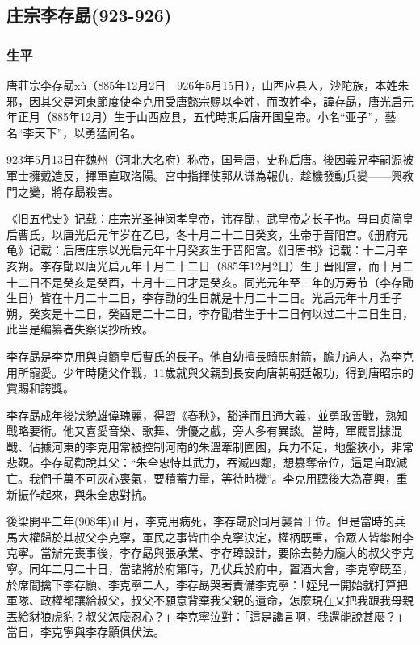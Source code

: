 
\subsection{庄宗李存勗\tiny(923-926)}

\subsubsection{生平}

唐莊宗李存勗xù（885年12月2日－926年5月15日），山西应县人，沙陀族，本姓朱邪，因其父是河東節度使李克用受唐懿宗赐以李姓，而改姓李，諱存勗，唐光启元年正月（885年12月）生于山西应县，五代時期后唐开国皇帝。小名“亚子”，藝名“李天下”，以勇猛闻名。

923年5月13日在魏州（河北大名府）称帝，国号唐，史称后唐。後因義兄李嗣源被軍士擁戴造反，揮軍直取洛陽。宮中指揮使郭从谦為報仇，趁機發動兵變——興教門之變，將存勗殺害。

《旧五代史》记载：庄宗光圣神闵孝皇帝，讳存勖，武皇帝之长子也。母曰贞简皇后曹氏，以唐光启元年岁在乙巳，冬十月二十二日癸亥，生帝于晋阳宫。《册府元龟》记载：后唐庄宗以光启元年十月癸亥生于晋阳宫。《旧唐书》记载：十二月辛亥朔。李存勖以唐光启元年十月二十二日（885年12月2日）生于晋阳宫，而十月二十二日不是癸亥是癸酉，十月十二日才是癸亥。同光元年至三年的万寿节（李存勖生日）皆在十月二十二日，李存勖的生日就是十月二十二日。光启元年十月壬子朔，癸亥是十二日，癸酉是二十二日，李存勖若生于十二日何以过二十二日生日，此当是编纂者失察误抄所致。

李存勗是李克用與貞簡皇后曹氏的長子。他自幼擅長騎馬射箭，膽力過人，為李克用所寵愛。少年時隨父作戰，11歲就與父親到長安向唐朝朝廷報功，得到唐昭宗的賞賜和誇獎。

李存勗成年後狀貌雄偉瑰麗，得習《春秋》，豁達而且通大義，並勇敢善戰，熟知戰略要術。他又喜愛音樂、歌舞、俳優之戲，旁人多有異談。當時，軍閥割據混戰、佔據河東的李克用常被控制河南的朱溫牽制圍困，兵力不足，地盤狹小，非常悲觀。李存勗勸說其父：“朱全忠恃其武力，吞滅四鄰，想篡奪帝位，這是自取滅亡。我們千萬不可灰心喪氣，要積蓄力量，等待時機”。李克用聽後大為高興，重新振作起來，與朱全忠對抗。

後梁開平二年(908年)正月，李克用病死，李存勗於同月襲晉王位。但是當時的兵馬大權歸於其叔父李克寧，軍民之事皆由李克寧決定，權柄既重，令眾人皆攀附李克寧。當辦完喪事後，李存勗與張承業、李存璋設計，要除去勢力龐大的叔父李克寧。同年二月二十日，當諸將於府第時，乃伏兵於府中，置酒大會，李克寧既至，於席間擒下李存顥、李克寧二人，李存勗哭著責備李克寧：「姪兒一開始就打算把軍隊、政權都讓給叔父，叔父不願意背棄我父親的遺命，怎麼現在又把我跟我母親丟給豺狼虎豹？叔父怎麼忍心？」李克寧泣對：「這是讒言啊，我還能說甚麼？」當日，李克寧與李存顥俱伏法。

